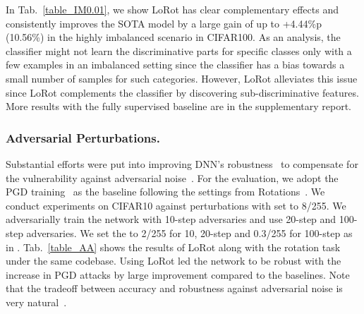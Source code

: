 In Tab.~\ref{table_IM0.01}, we show LoRot has clear complementary effects and consistently improves the SOTA model by a large gain of up to +4.44\%p (10.56\%) in the highly imbalanced scenario in CIFAR100.
As an analysis, the classifier might not learn the discriminative parts for specific classes only with a few examples in an imbalanced setting since the classifier has a bias towards a small number of samples for such categories.
However, LoRot alleviates this issue since LoRot complements the classifier by discovering sub-discriminative features.
More results with the fully supervised baseline are in the supplementary report.



\subsubsection{Adversarial Perturbations.}
\label{subsection:AAExperiments}
Substantial efforts were put into improving DNN's robustness~\cite{madry2017towards, athalye2018obfuscated, dong2020benchmarking} to compensate for the vulnerability against adversarial noise~\cite{szegedy2013intriguing}.
For the evaluation, we adopt the PGD training~\cite{madry2017towards} as the baseline following the settings from Rotations~\cite{hendrycks2019using}. 
We conduct experiments on CIFAR10 against  perturbations with  set to 8/255. We adversarially train the network with 10-step adversaries and use 20-step and 100-step adversaries. We set the  to 2/255 for 10, 20-step and 0.3/255 for 100-step as in \cite{madry2017towards, hendrycks2019using}.
Tab.~\ref{table_AA} shows the results of LoRot along with the rotation task under the same codebase. Using LoRot led the network to be robust with the increase in PGD attacks by large improvement compared to the baselines. Note that the tradeoff between accuracy and robustness against adversarial noise is very natural~\cite{zhang2019theoretically}.



